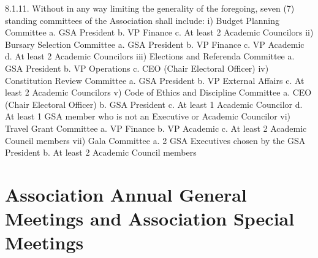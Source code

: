 8.1.11. Without in any way limiting the generality of the foregoing, seven 
(7) standing committees of the Association shall include: 
i) Budget Planning Committee 
a. GSA President 
b. VP Finance 
c. At least 2 Academic Councilors 
ii) Bursary Selection Committee 
a. GSA President 
b. VP Finance 
c. VP Academic 
d. At least 2 Academic Councilors 
iii) Elections and Referenda Committee 
a. GSA President 
b. VP Operations 
c. CEO (Chair Electoral Officer) 
iv) Constitution Review Committee 
a. GSA President 
b. VP External Affairs 
c. At least 2 Academic Councilors 
v) Code of Ethics and Discipline Committee 
a. CEO (Chair Electoral Officer) 
b. GSA President 
c. At least 1 Academic Councilor 
d. At least 1 GSA member who is not an Executive or Academic 
 Councilor 
vi) Travel Grant Committee 
a. VP Finance 
b. VP Academic 
c. At least 2 Academic Council members 
vii) Gala Committee 
a. 2 GSA Executives chosen by the GSA President 
b. At least 2 Academic Council members 
\section{ Association Annual General Meetings and Association Special  Meetings }
